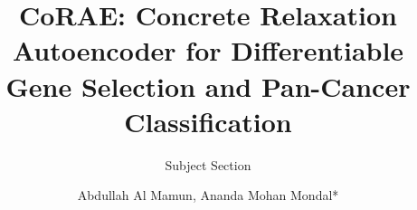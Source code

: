 \documentclass{bioinfo}
\begin{document}

\subtitle{Subject Section}

\title[short Title]{
CoRAE: Concrete Relaxation Autoencoder for Differentiable Gene Selection and Pan-Cancer Classification
}
\author[Sample \textit{et~al}.]{Abdullah Al Mamun, Ananda Mohan Mondal*}

\address{
School of Computing and Information Sciences \\
Florida International University, Miami, USA
}



\end{document}
